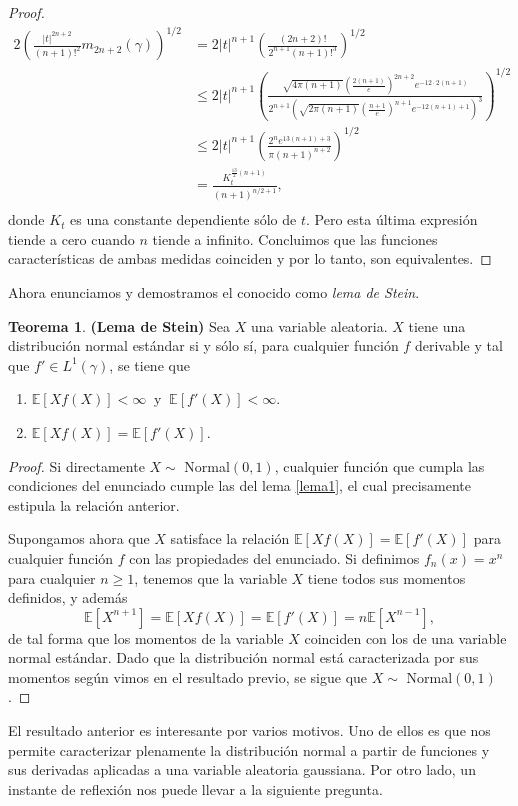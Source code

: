 \documentclass[letterpaper,twoside,12pt]{book}
\newcommand{\E}{\mathbb{E}}
\newcommand{\1}{\mathds{1}}
\newcommand{\abs}[1]{\left\lvert #1 \right\rvert}
\theoremstyle{definition}
\theoremstyle{definition}
\newtheorem{teo}{Teorema}
\theoremstyle{remark}
\theoremstyle{definition}
\theoremstyle{definition}
\theoremstyle{definition}
\theoremstyle{definition}
\theoremstyle{definition}
\begin{document}
\begin{proof}
\begin{align*}
      2\left(\frac{\abs{t}^{2n+2}}{(n+1)!^2}m_{2n+2}(\gamma)\right)^{1/2}&=2|t|^{n+1}\left(\frac{(2n+2)!}{2^{n+1}(n+1)!^3}\right)^{1/2}\\
      &\leq 2|t|^{n+1}\left(\frac{\sqrt{4\pi(n+1)}\left(\tfrac{2(n+1)}{e}\right)^{2n+2}e^{-12\cdot 2(n+1)}}{2^{n+1}\left(\sqrt{2\pi(n+1)}\left(\tfrac{n+1}{e}\right)^{n+1}e^{-12(n+1)+1}\right)^{3}}\right)^{1/2}\\
      &\leq 2|t|^{n+1}\left(\frac{2^ne^{13(n+1)+3}}{\pi(n+1)^{n+2}}\right)^{1/2}\\
      &=\frac{K_t^{\tfrac{13}{2}(n+1)}}{(n+1)^{n/2+1}},\\
   \end{align*} 
   donde $K_t$ es una constante dependiente sólo de $t$. Pero esta última expresión tiende a cero cuando $n$ tiende a infinito. Concluimos que las funciones características de ambas medidas coinciden y por lo tanto, son equivalentes.
  \end{proof}

Ahora enunciamos y demostramos el conocido como \textit{lema de Stein}.
\begin{teo}\textbf{(Lema de Stein)} \label{LemaStein} Sea $X$ una variable aleatoria. $X$ tiene una distribución normal estándar si y sólo sí, para cualquier función $f$ derivable y tal que $f'\in L^{1}(\gamma)$, se tiene que
   \begin{enumerate}
       \item $\E\left[Xf(X)\right]<\infty \ $ y $ \ \E\left[f'(X)\right]<\infty$.
       \item $\E\left[Xf(X)\right]=\E\left[f'(X)\right]$.
   \end{enumerate}
\end{teo}
\begin{proof} 
  Si directamente $X\sim$ Normal$(0,1)$, cualquier función que cumpla las condiciones del enunciado cumple las del lema \ref{lema1}, el cual precisamente estipula la relación anterior. 

  Supongamos ahora que $X$ satisface la relación $\E\left[Xf(X)\right]=\E\left[f'(X)\right]$ para cualquier función $f$ con las propiedades del enunciado. Si definimos $f_n(x)=x^n$ para cualquier $n\geq1$, tenemos que la variable $X$ tiene todos sus momentos definidos, y además 
  \[
   \E\left[X^{n+1}\right]=\E\left[Xf(X)\right]=\E\left[f'(X)\right]=n\E\left[X^{n-1}\right],
  \] 
  de tal forma que los momentos de la variable $X$ coinciden con los de una variable normal estándar. Dado que la distribución normal está caracterizada por sus momentos según vimos en el resultado previo, se sigue que $X\sim$ Normal$(0,1)$.
 \end{proof}
El resultado anterior es interesante por varios motivos. Uno de ellos es que nos permite caracterizar plenamente la distribución normal a partir de funciones y sus derivadas aplicadas a una variable aleatoria gaussiana. Por otro lado, un instante de reflexión nos puede llevar a la siguiente pregunta.
\end{document}

